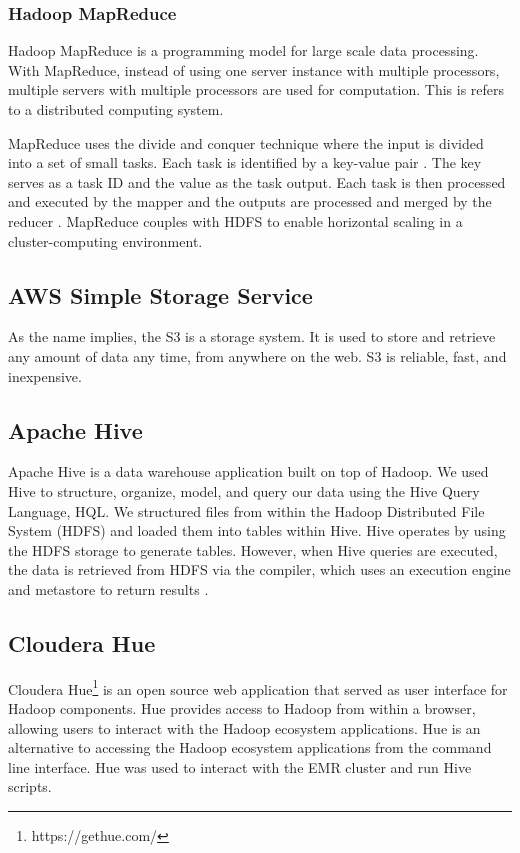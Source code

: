 \documentclass[journal]{IEEEtran}
\begin{document}
\subsubsection{Hadoop MapReduce}

Hadoop MapReduce is a programming model for large scale data processing. With MapReduce, instead of using one server instance with multiple 
processors, multiple servers with multiple processors are used for computation. This is refers to a distributed computing system.

MapReduce uses the divide and conquer technique where the input is divided into a set of small tasks. Each task is identified by a key-value 
pair \cite{Divide-and-Conquer}. The key serves as a task ID and the value as the task output. Each task is then processed and executed by the 
mapper and the outputs are processed and merged by the reducer \cite{MapReduce}. MapReduce couples with HDFS to enable horizontal
scaling in a cluster-computing environment.

\subsection{AWS Simple Storage Service}

As the name implies, the S3 is a storage system.
It is used to store and retrieve any amount of data any time, from anywhere on the web. 
S3 is reliable, fast, and inexpensive.

\subsection{Apache Hive}

Apache Hive is a data warehouse application built on top of Hadoop. We used Hive to structure, organize, model, and query our data using the Hive 
Query Language, HQL. We structured files from within the Hadoop Distributed File System (HDFS) and loaded them into tables within Hive. 
Hive operates by using the HDFS storage to generate tables. However, when Hive queries are executed, the data is retrieved from HDFS via the compiler, 
which uses an execution engine and metastore to return results \cite{Hivemetastore}. 

\subsection{Cloudera Hue}

Cloudera Hue\footnote{https://gethue.com/}
 is an open source web application that served as user interface for Hadoop components.
Hue provides access to Hadoop from within a browser, allowing users to interact with the Hadoop ecosystem applications. 
Hue is an alternative to accessing the Hadoop ecosystem applications from the command line interface.
Hue was used to interact with the EMR cluster and run Hive scripts.
\end{document}
